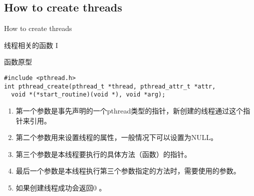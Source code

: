 \documentclass{beamer}
\begin{document}
\subsection{How to create threads}
\begin{frame}
\Huge{\centerline{How to create threads}}
\end{frame}
\begin{frame}[fragile]{线程相关的函数 I}
\begin{block}{函数原型}
\begin{verbatim}
#include <pthread.h>
int pthread_create(pthread_t *thread, pthread_attr_t *attr, 
  void *(*start_routine)(void *), void *arg);
\end{verbatim}
\begin{enumerate}
\item
第一个参数是事先声明的一个pthread类型的指针，新创建的线程通过这个指针来引用。
\item
第二个参数用来设置线程的属性，一般情况下可以设置为NULL。
\item
第三个参数是本线程要执行的具体方法（函数）的指针。
\item
最后一个参数是本线程执行第三个参数指定的方法时，需要使用的参数。
\item
如果创建线程成功会返回0 。
\end{enumerate}
\end{block}
\end{frame}
\end{document}
